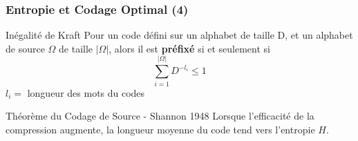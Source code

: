\documentclass[aspectratio=43]{beamer}
\begin{document}
\begin{frame}
    \frametitle{Entropie et Codage Optimal (4)}

    \begin{block}{Inégalité de Kraft}
        Pour un code défini sur un alphabet de taille D, et un alphabet de source $\Omega$ de taille 
$|\Omega|$, alors il est \textbf{préfixé} si et seulement si $$\sum _{{i=1}}^{{|\Omega |}}D^{{-l_{i}}}\leq 1$$
$l_i =$ longueur des mots du codes
    \end{block}

    \vspace*{2em}

    \begin{alertblock}{Théorème du Codage de Source - Shannon 1948}
        Lorsque l'efficacité de la compression augmente, la longueur moyenne du code tend vers l'entropie $H$.
    \end{alertblock}
    
\end{frame}
\end{document}

